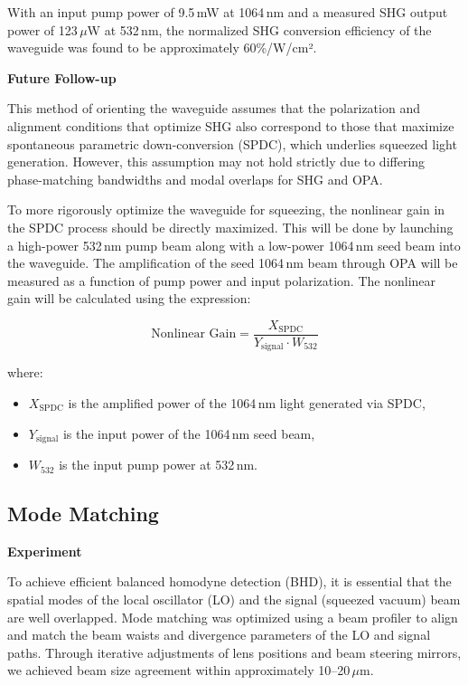 \documentclass[colorlinks=true,pdfstartview=FitV,linkcolor=blue,
citecolor=red,urlcolor=magenta]{ligodoc}
\begin{document}
With an input pump power of 9.5\,mW at 1064\,nm and a measured SHG output power of 123\,$\mu$W at 532\,nm, the normalized SHG conversion efficiency of the waveguide was found to be approximately 60\%/W/cm².

\vspace{0.5em}

\textbf{Future Follow-up}

This method of orienting the waveguide assumes that the polarization and alignment conditions that optimize SHG also correspond to those that maximize spontaneous parametric down-conversion (SPDC), which underlies squeezed light generation. However, this assumption may not hold strictly due to differing phase-matching bandwidths and modal overlaps for SHG and OPA.

To more rigorously optimize the waveguide for squeezing, the nonlinear gain in the SPDC process should be directly maximized. This will be done by launching a high-power 532\,nm pump beam along with a low-power 1064\,nm seed beam into the waveguide. The amplification of the seed 1064\,nm beam through OPA will be measured as a function of pump power and input polarization. The nonlinear gain will be calculated using the expression:

\[
\text{Nonlinear Gain} = \frac{X_{\text{SPDC}}}{Y_{\text{signal}} \cdot W_{532}}
\]

where:
\begin{itemize}
    \item $X_{\text{SPDC}}$ is the amplified power of the 1064\,nm light generated via SPDC,
    \item $Y_{\text{signal}}$ is the input power of the 1064\,nm seed beam,
    \item $W_{532}$ is the input pump power at 532\,nm.
\end{itemize}

  




 

\subsection{Mode Matching}

\textbf{Experiment}

To achieve efficient balanced homodyne detection (BHD), it is essential that the spatial modes of the local oscillator (LO) and the signal (squeezed vacuum) beam are well overlapped. Mode matching was optimized using a beam profiler to align and match the beam waists and divergence parameters of the LO and signal paths. Through iterative adjustments of lens positions and beam steering mirrors, we achieved beam size agreement within approximately 10--20\,$\mu$m.
\end{document}
